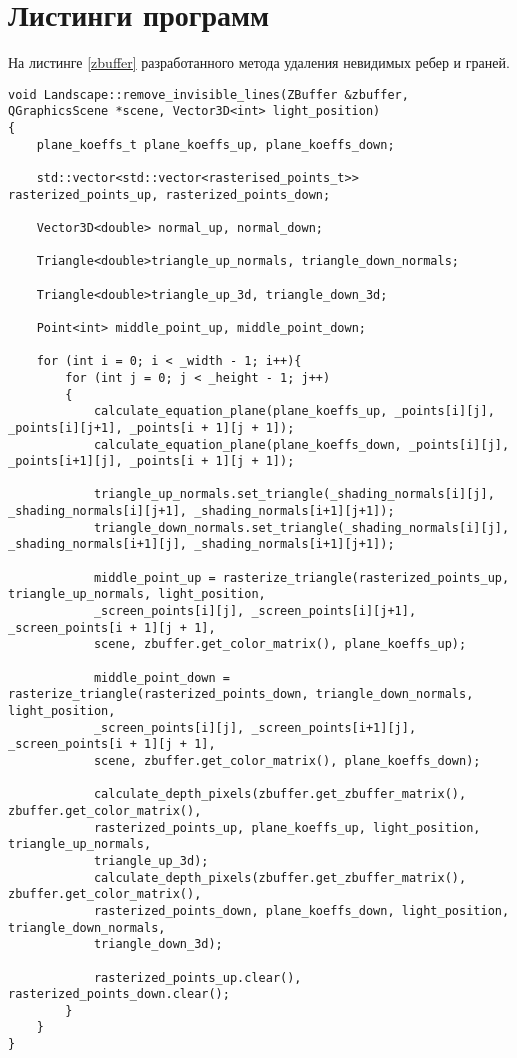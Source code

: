 \section{Листинги программ}
На листинге \ref{zbuffer} разработанного метода удаления невидимых ребер и граней.
\newpage
\begin{lstlisting}[label = zbuffer, caption=Программный код алгоритма удаления невидимых ребер и граней.]
void Landscape::remove_invisible_lines(ZBuffer &zbuffer, QGraphicsScene *scene, Vector3D<int> light_position)
{
	plane_koeffs_t plane_koeffs_up, plane_koeffs_down;

	std::vector<std::vector<rasterised_points_t>> rasterized_points_up, rasterized_points_down;
	
	Vector3D<double> normal_up, normal_down;
	
	Triangle<double>triangle_up_normals, triangle_down_normals;
	
	Triangle<double>triangle_up_3d, triangle_down_3d;
	
	Point<int> middle_point_up, middle_point_down;
	
	for (int i = 0; i < _width - 1; i++){
		for (int j = 0; j < _height - 1; j++)
		{
			calculate_equation_plane(plane_koeffs_up, _points[i][j], _points[i][j+1], _points[i + 1][j + 1]);
			calculate_equation_plane(plane_koeffs_down, _points[i][j], _points[i+1][j], _points[i + 1][j + 1]);
			
			triangle_up_normals.set_triangle(_shading_normals[i][j], _shading_normals[i][j+1], _shading_normals[i+1][j+1]);
			triangle_down_normals.set_triangle(_shading_normals[i][j], _shading_normals[i+1][j], _shading_normals[i+1][j+1]);
			
			middle_point_up = rasterize_triangle(rasterized_points_up, triangle_up_normals, light_position,
			_screen_points[i][j], _screen_points[i][j+1], _screen_points[i + 1][j + 1],
			scene, zbuffer.get_color_matrix(), plane_koeffs_up);
			
			middle_point_down = rasterize_triangle(rasterized_points_down, triangle_down_normals, light_position,
			_screen_points[i][j], _screen_points[i+1][j], _screen_points[i + 1][j + 1],
			scene, zbuffer.get_color_matrix(), plane_koeffs_down);
			
			calculate_depth_pixels(zbuffer.get_zbuffer_matrix(), zbuffer.get_color_matrix(),
			rasterized_points_up, plane_koeffs_up, light_position, triangle_up_normals,
			triangle_up_3d);
			calculate_depth_pixels(zbuffer.get_zbuffer_matrix(), zbuffer.get_color_matrix(),
			rasterized_points_down, plane_koeffs_down, light_position, triangle_down_normals,
			triangle_down_3d);
			
			rasterized_points_up.clear(), rasterized_points_down.clear();
		}
	}
}
\end{lstlisting}

